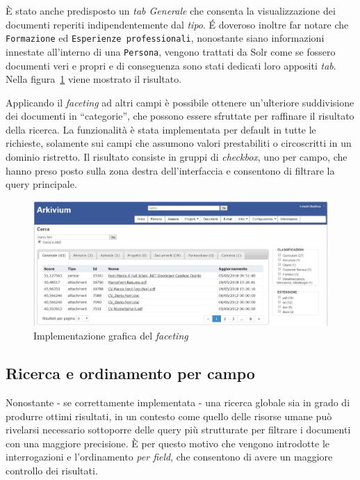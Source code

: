 È stato anche predisposto un \textit{tab Generale} che consenta la visualizzazione dei documenti reperiti indipendentemente dal \textit{tipo}. É doveroso inoltre far notare che \texttt{Formazione} ed \texttt{Esperienze professionali}, nonostante siano informazioni innestate all’interno di una \texttt{Persona}, vengono trattati da Solr come se fossero documenti veri e propri e di conseguenza sono stati dedicati loro appositi \textit{tab}. \newline
Nella figura~\ref{fig:gui2} viene mostrato il risultato.

\vspace{2em}

Applicando il \textit{faceting} ad altri campi è possibile ottenere un’ulteriore suddivisione dei documenti in “categorie”, che possono essere sfruttate per raffinare il risultato della ricerca. La funzionalità è stata implementata per default in tutte le richieste, solamente sui campi che assumono valori prestabiliti o circoscritti in un dominio ristretto. Il risultato consiste in gruppi di \textit{checkbox}, uno per campo, che hanno preso posto sulla zona destra dell’interfaccia e consentono di filtrare la query principale.

\begin{figure}[H]
	\centering
	\includegraphics[scale=0.5]{../images/03_3_faceting}
	\caption[Implementazione grafica del \textit{faceting}]{Implementazione grafica  del \textit{faceting}}
	\label{fig:gui2}
\end{figure}



\subsection{Ricerca e ordinamento per campo}

Nonostante - se correttamente implementata - una ricerca globale sia in grado di produrre ottimi risultati, in un contesto come quello delle risorse umane può rivelarsi necessario sottoporre delle query più strutturate per filtrare i documenti con una maggiore precisione. È per questo motivo che vengono introdotte le interrogazioni e l’ordinamento \textit{per field}, che consentono di avere un maggiore controllo dei risultati.

